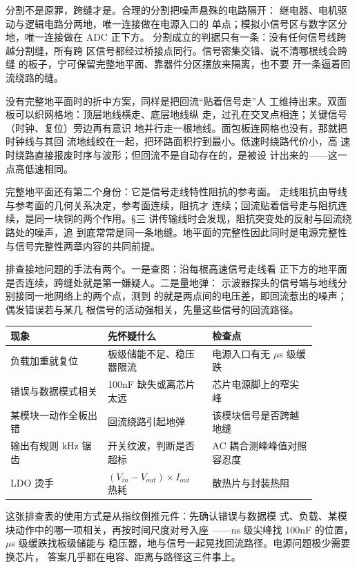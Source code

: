 分割不是原罪，跨缝才是。合理的分割把噪声悬殊的电路隔开：
继电器、电机驱动与逻辑电路分两地，唯一连接做在电源入口的
单点；模拟小信号区与数字区分地，唯一连接做在 ADC 正下方。
分割成立的判据只有一条：没有任何信号线跨越分割缝，所有跨
区信号都经过桥接点同行。信号密集交错、说不清哪根线会跨缝
的板子，宁可保留完整地平面、靠器件分区摆放来隔离，也不要
开一条逼着回流绕路的缝。

没有完整地平面时的折中方案，同样是把回流“贴着信号走”人
工维持出来。双面板可以织网格地：顶层地线横走、底层地线纵
走，过孔在交叉点相连；关键信号（时钟、复位）旁边再有意识
地并行走一根地线。面包板连网格也没有，那就把时钟线与其回
流地线绞在一起，把环路面积拧到最小。低速时绕路代价小，高
速时绕路直接报废时序与波形；但回流不是自动存在的，是被设
计出来的——这一点高低速相同。

完整地平面还有第二个身份：它是信号走线特性阻抗的参考面。
走线阻抗由导线与参考面的几何关系决定，参考面连续，阻抗才
连续；回流贴着信号走与阻抗连续，是同一块铜的两个作用。§三
讲传输线时会发现，阻抗突变处的反射与回流绕路处的噪声，追
到底常常是同一条地缝。地平面的完整性因此同时是电源完整性
与信号完整性两章内容的共同前提。

排查接地问题的手法有两个。一是查图：沿每根高速信号走线看
正下方的地平面是否连续，跨缝处就是第一嫌疑人。二是量地弹：
示波器探头的信号端与地线分别接同一地网络上的两个点，测到
的就是两点间的电压差，即回流惹出的噪声；偶发错误若与某几
根信号的活动强相关，先量这些信号的回流路径。

\begin{longtable}{L{0.28\linewidth}L{0.3\linewidth}L{0.3\linewidth}}
\toprule
现象 & 先怀疑什么 & 检查点 \\
\midrule
负载加重就复位 & 板级储能不足、稳压器限流 & 电源入口有无 $\mu$s 级缓跌 \\
错误与数据模式相关 & 100nF 缺失或离芯片太远 & 芯片电源脚上的窄尖峰 \\
某模块一动作全板出错 & 回流绕路引起地弹 & 该模块信号是否跨越地缝 \\
输出有规则 kHz 锯齿 & 开关纹波，判断是否超标 & AC 耦合测峰峰值对照容忍度 \\
LDO 烫手 & $(V_{in}-V_{out}) \times I_{out}$ 热耗 & 散热片与封装热阻 \\
\bottomrule
\end{longtable}

这张排查表的使用方式是从指纹倒推元件：先确认错误与数据模
式、负载、某模块动作中的哪一项相关，再按时间尺度对号入座
——ns 级尖峰找 100nF 的位置，$\mu$s 级缓跌找板级储能与
稳压器，地与信号一起晃找回流路径。电源问题极少需要换芯片，
答案几乎都在电容、距离与路径这三件事上。

